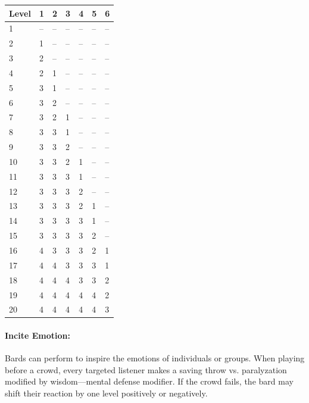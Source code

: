 \begin{multicols}{2}
\begin{minipage}{\columnwidth}
\label{bardspells}
\noindent
\begin{tabular}{|m{}|m{}|m{}|m{}|m{}|m{}|m{}|}
\hline
Level	& 1	& 2	& 3	& 4	& 5	& 6 \\
\hline\hline
\rowcolor[gray]{.9}1	& --	& --	& --	& --	& --	& -- \\
2	& 1		& --	& --	& --	& --	& -- \\
\rowcolor[gray]{.9}3	& 2		& --	& --	& --	& --	& -- \\
4	& 2		& 1		& --	& --	& --	& -- \\
\rowcolor[gray]{.9}5	& 3		& 1		& --	& --	& --	& -- \\
6	& 3		& 2		& --	& --	& --	& -- \\
\rowcolor[gray]{.9}7	& 3		& 2		& 1		& --	& --	& -- \\
8	& 3		& 3		& 1		& --	& --	& -- \\
\rowcolor[gray]{.9}9	& 3		& 3		& 2		& --	& --	& -- \\
10	& 3		& 3		& 2		& 1		& --	& -- \\
\rowcolor[gray]{.9}11	& 3		& 3		& 3		& 1		& --	& -- \\
12	& 3		& 3		& 3		& 2		& --	& -- \\
\rowcolor[gray]{.9}13	& 3		& 3		& 3		& 2		& 1		& -- \\
14	& 3		& 3		& 3		& 3		& 1		& -- \\
\rowcolor[gray]{.9}15	& 3		& 3		& 3		& 3		& 2		& -- \\
16	& 4		& 3		& 3		& 3		& 2		& 1 \\
\rowcolor[gray]{.9}17	& 4		& 4		& 3		& 3		& 3		& 1 \\
18	& 4		& 4		& 4		& 3		& 3		& 2 \\
\rowcolor[gray]{.9}19	& 4		& 4		& 4		& 4		& 4		& 2 \\
20	& 4		& 4		& 4		& 4		& 4		& 3 \\
\hline
\end{tabular}

\end{minipage}

\paragraph{Incite Emotion:} Bards can perform to inspire the emotions of individuals or groups.  When playing before a crowd, every targeted listener makes a saving throw vs. paralyzation modified by wisdom---mental defense modifier.  If the crowd fails, the bard may shift their reaction by one level positively or negatively.  


\end{multicols}
